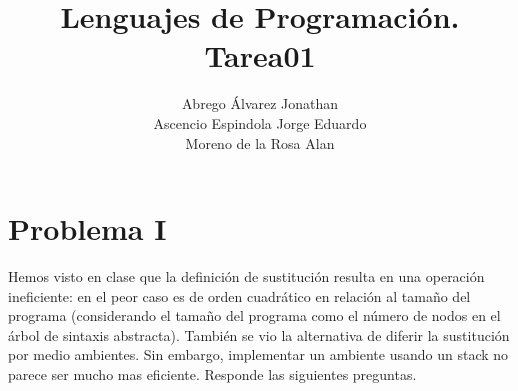 \documentclass[a4paper]{article}
\title{Lenguajes de Programación. Tarea01}
\author{Abrego Álvarez Jonathan \\
Ascencio Espindola Jorge Eduardo \\
Moreno de la Rosa Alan}
\begin{document}
\maketitle

\section{Problema I}

Hemos visto en clase que la definición de sustitución resulta en una operación ineficiente: en el peor caso es de orden cuadrático en relación al tamaño del programa (considerando el tamaño del programa como el número de
nodos en el árbol de sintaxis abstracta). También se vio la alternativa de diferir la sustitución por medio ambientes. Sin embargo, implementar un ambiente usando un stack no parece ser mucho mas eficiente.
Responde las siguientes preguntas.
\end{document}
